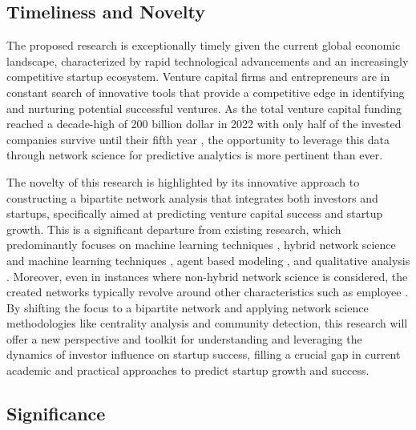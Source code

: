 \documentclass[a4paper,11pt]{article}
\begin{document}
\subsection{Timeliness and Novelty}

The proposed research is exceptionally timely given the current global economic landscape, characterized by rapid technological advancements and an increasingly competitive startup ecosystem. Venture capital firms and entrepreneurs are in constant search of innovative tools that provide a competitive edge in identifying and nurturing potential successful ventures. As the total venture capital funding reached a decade-high of 200 billion dollar in 2022 \cite{embroker2024a} with only half of the invested companies survive until their fifth year \cite{kotashev2024a}, the opportunity to leverage this data through network science for predictive analytics is more pertinent than ever.

The novelty of this research is highlighted by its innovative approach to constructing a bipartite network analysis that integrates both investors and startups, specifically aimed at predicting venture capital success and startup growth. This is a significant departure from existing research, which predominantly focuses on machine learning techniques \cite{krishna2016a} \cite{sharchilev2018a}, hybrid network science and machine learning techniques \cite{carniel2023a} \cite{yang2020a}, agent based modeling \cite{lengyel2020a}, and qualitative analysis \cite{mccarthy2023a}. Moreover, even in instances where non-hybrid network science is considered, the created networks typically revolve around other characteristics such as employee \cite{bonaventura2020a}. By shifting the focus to a bipartite network and applying network science methodologies like centrality analysis and community detection, this research will offer a new perspective and toolkit for understanding and leveraging the dynamics of investor influence on startup success, filling a crucial gap in current academic and practical approaches to predict startup growth and success.

\subsection{Significance}
\end{document}
